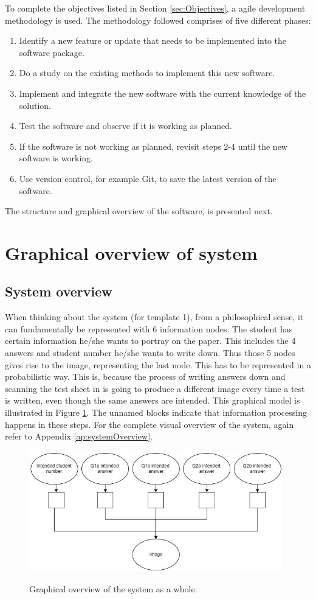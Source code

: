 To complete the objectives listed in Section \ref{sec:Objectives}, a agile development methodology is used. The methodology followed comprises of five different phases:
\begin{enumerate}
\item Identify a new feature or update that needs to be implemented into the software package.
\item Do a study on the existing methods to implement this new software.
\item Implement and integrate the new software with the current knowledge of the solution.
\item Test the software and observe if it is working as planned.
\item If the software is not working as planned, revisit steps 2-4 until the new software is working.
\item Use version control, for example Git, to save the latest version of the software.
\end{enumerate}

The structure and graphical overview of the software, is presented next.

\section{Graphical overview of system}
\subsection{System overview}

When thinking about the system (for template 1), from a philosophical sense, it can fundamentally be represented with 6 information nodes. The student has certain information he/she wants to portray on the paper. This includes the 4 answers and student number he/she wants to write down. Thus those 5 nodes gives rise to the image, representing the last node. This has to be represented in a probabilistic way. This is, because the process of writing answers down and scanning the test sheet in is going to produce a different image every time a test is written, even though the same answers are intended. This graphical model is illustrated in Figure \ref{fig:systemOverview}. The unnamed blocks indicate that information processing happens in these steps. For the complete visual overview of the system, again refer to Appendix \ref{ap:systemOverview}.
\begin{figure}
  \centering
  \includegraphics[width=11cm]{systemOverview}\\
  \caption{Graphical overview of the system as a whole.}
  \label{fig:systemOverview}
\end{figure}

